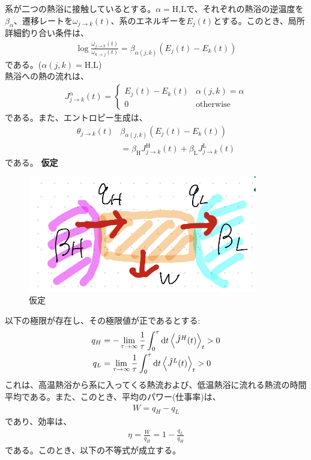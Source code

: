 \documentclass[a4paper,11pt]{jsarticle}
\numberwithin{equation}{section}
\begin{document}
系が二つの熱浴に接触しているとする。$\alpha = \text{H,L}$で、それぞれの熱浴の逆温度を$\beta_{\alpha}$、遷移レートを$\omega_{j \to k}(t)$、系のエネルギーを$E_j(t)$とする。このとき、局所詳細釣り合い条件は、
\begin{align}
  \log \frac{\omega_{j \to k}(t)}{\omega_{k \to j}(t)} = \beta_{\alpha(j,k)}(E_j(t) - E_k(t))
\end{align}
である。($\alpha(j,k) = \text{H,L}$)\\
熱浴への熱の流れは、
\begin{align}
  {J}^{\alpha}_{j\to k}(t) =
  \begin{cases}
    E_j(t) - E_k(t) & \alpha(j,k) = \alpha\\
    0 & \text{otherwise}
    \end{cases}
\end{align}
である。また、エントロピー生成は、
\begin{align}
  \theta_{j \to k}(t) & \beta_{\alpha(j,k)}(E_j(t) - E_k(t))\\
    &= \beta_{\text{H}}J^{\text{H}}_{j\to k}(t) + \beta_{\text{L}}J^{\text{L}}_{j\to k}(t)
\end{align}
である。
\textbf{仮定}\\
\begin{figure}[H]
    \begin{center}
    \includegraphics[width=100mm]{set2.png}
    \end{center}
    \caption{仮定}
    \label{fig:set2}
\end{figure}

以下の極限が存在し、その極限値が正であるとする:
\begin{align}
  q_H &= -\lim_{\tau \to \infty}\frac{1}{\tau}\int_0^{\tau} \dd{t}\ev{\hat{J}^H(t)}_t>0\\
  q_L &= \lim_{\tau \to \infty}\frac{1}{\tau}\int_0^{\tau} \dd{t}\ev{\hat{J}^L(t)}_t>0
\end{align}
これは、高温熱浴から系に入ってくる熱流および、低温熱浴に流れる熱流の時間平均である。また、このとき、平均のパワー(仕事率)は、
\begin{align}
  W = q_H - q_L
\end{align}
であり、効率は、
\begin{align}
  \eta = \frac{W}{q_H} = 1 - \frac{q_L}{q_H}
\end{align}
である。このとき、以下の不等式が成立する。
\end{document}
